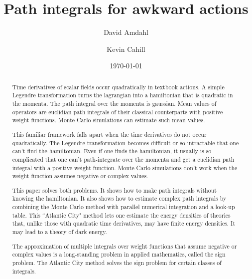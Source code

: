\documentclass[prd,preprint,floatfix,showpacs]{revtex4-1}
\begin{document}
\title{Path integrals for awkward actions}

\author{David Amdahl} 
\author{Kevin Cahill}

\date{\today}
 

\begin {abstract}
Time derivatives of scalar fields
occur quadratically in textbook actions.
A simple Legendre transformation 
turns the lagrangian into a 
hamiltonian that is quadratic in the momenta.
The path integral over the momenta is gaussian.
Mean values of operators are 
euclidian path integrals of their classical counterparts
with positive weight functions.
Monte Carlo simulations can estimate 
such mean values.
\par
This familiar framework falls apart
when the time derivatives do not occur
quadratically.  
The Legendre transformation 
becomes difficult or so intractable
that one can't find the hamiltonian.  
Even if one finds the hamiltonian, 
it usually is so complicated
that one can't path-integrate 
over the momenta and get 
a euclidian path integral with
a positive weight function.
Monte Carlo simulations don't work
when the weight function
assumes negative or complex values.
\par
This paper solves both problems.
It shows how to make path integrals 
without knowing the hamiltonian. 
It also shows how to estimate
complex path integrals 
by combining the Monte Carlo method
with parallel numerical integration and
a look-up table. 
This ``Atlantic City" method lets one
estimate the energy densities
of theories that, unlike those 
with quadratic time derivatives,
may have finite energy densities.
It may lead to a theory of dark energy.
\par 
The approximation of multiple
integrals over weight functions
that assume negative or complex values
is a long-standing problem 
in applied mathematics,
called the sign problem.
The Atlantic City method
solves the sign problem 
for certain classes of integrals.
\end {abstract}


\maketitle
\end{document}
